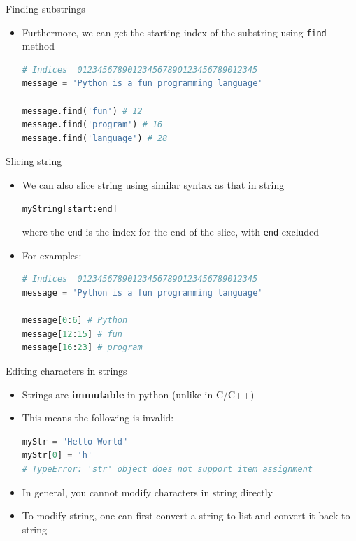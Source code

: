 \documentclass[10pt,xcolor={table,dvipsnames},t]{beamer}
\begin{document}
\begin{frame}[fragile]{Finding substrings}
  \begin{itemize}
    \item Furthermore, we can get the starting index of the substring using \texttt{find} method
\begin{lstlisting}[language=python]
# Indices  012345678901234567890123456789012345
message = 'Python is a fun programming language'

message.find('fun') # 12
message.find('program') # 16
message.find('language') # 28
\end{lstlisting}
  \end{itemize}
\end{frame}

\begin{frame}[fragile]{Slicing string}
  \begin{itemize}
    \item We can also slice string using similar syntax as that in string 
\begin{lstlisting}[language=python]
  myString[start:end]
\end{lstlisting}
where the \texttt{end} is the index for the end of the slice, with \texttt{end} excluded
    \item For examples:
\begin{lstlisting}[language=python]
# Indices  012345678901234567890123456789012345
message = 'Python is a fun programming language'

message[0:6] # Python 
message[12:15] # fun
message[16:23] # program
\end{lstlisting}
  \end{itemize}
\end{frame}


\begin{frame}[fragile]{Editing characters in strings}
  \begin{itemize}
    \item Strings are \textbf{immutable} in python (unlike in C/C++)
    \item This means the following is invalid:
\begin{lstlisting}[language=python]
myStr = "Hello World"
myStr[0] = 'h' 
# TypeError: 'str' object does not support item assignment
\end{lstlisting}
  \item In general, you cannot modify characters in string directly 
  \item To modify string, one can first convert a string to list and convert it back to string 
  \end{itemize}
\end{frame}
\end{document}
